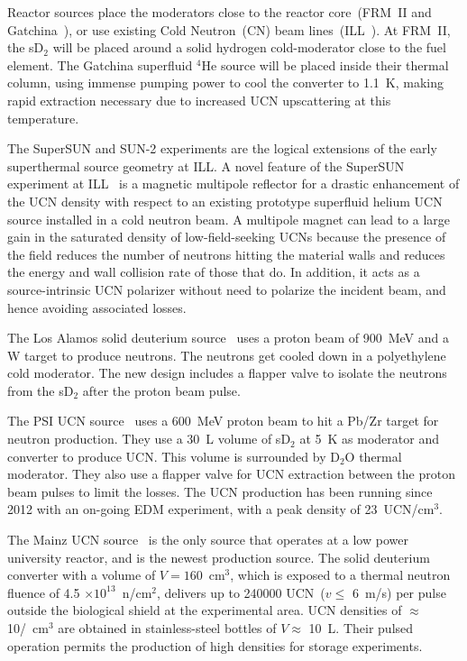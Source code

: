 Reactor sources place the moderators close to the reactor core~(FRM~II
and Gatchina~\cite{Serebrov_ascona}), or use existing Cold
Neutron~(CN) beam lines~(ILL~\cite{Piegsa2014}). At FRM~II, the sD$_2$
will be placed around a solid hydrogen cold-moderator close to the
fuel element. The Gatchina superfluid $^4$He source will be placed
inside their thermal column, using immense pumping power to cool the
converter to 1.1~K, making rapid extraction necessary due to increased
UCN upscattering at this temperature.

The SuperSUN and SUN-2 experiments are the logical extensions of the
early superthermal source geometry at ILL.  A novel feature of the
SuperSUN experiment at ILL~\cite{Zimmer2015} is a magnetic multipole
reflector for a drastic enhancement of the UCN density with respect to
an existing prototype superfluid helium UCN source installed in a cold
neutron beam. A multipole magnet can lead to a large gain in the
saturated density of low-field-seeking UCNs because the presence of
the field reduces the number of neutrons hitting the material walls
and reduces the energy and wall collision rate of those that do. In
addition, it acts as a source-intrinsic UCN polarizer without need to
polarize the incident beam, and hence avoiding associated losses.

The Los Alamos solid deuterium source~\cite{Ito_ascona} uses a
proton beam of 900~MeV and a W target to produce neutrons. The
neutrons get cooled down in a polyethylene cold moderator. The new
design includes a flapper valve to isolate the neutrons from the
sD$_2$ after the proton beam pulse.

The PSI UCN source~\cite{Ries_ascona} uses a 600~MeV proton beam
to hit a Pb/Zr target for neutron production. They use a 30~L volume
of sD$_2$ at 5~K as moderator and converter to produce UCN. This
volume is surrounded by D$_2$O thermal moderator. They also use a
flapper valve for UCN extraction between the proton beam pulses to
limit the losses. The UCN production has been running since 2012 with
an on-going EDM experiment, with a peak density of 23~UCN/cm$^3$.

The Mainz UCN source~\cite{Karch2014} is the only source that
operates at a low power university reactor, and is the newest
production source. The solid deuterium converter with a volume of $V =
160$~cm$^3$, which is exposed to a thermal neutron fluence of 4.5
$\times 10^{13}$~n/cm$^2$, delivers up to 240000 UCN~($v \leq$ 6~m/s)
per pulse outside the biological shield at the experimental area.  UCN
densities of $\approx$ 10/~cm$^3$ are obtained in stainless-steel
bottles of $V \approx$ 10~L. Their pulsed operation permits the
production of high densities for storage experiments.


